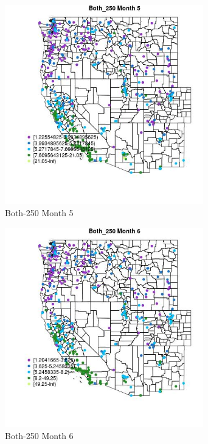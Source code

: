 \begin{figure} 
\centering  
\includegraphics[width=0.77\textwidth]{Code_Outputs/ML_input_report_ML_input_PM25_Step5_part_d_de_duplicated_aves_ML_input_MapObsMo5Both_250.jpg} 
\caption{\label{fig:ML_input_report_ML_input_PM25_Step5_part_d_de_duplicated_aves_ML_inputMapObsMo5Both_250}Both-250 Month 5} 
\end{figure} 
 

\begin{figure} 
\centering  
\includegraphics[width=0.77\textwidth]{Code_Outputs/ML_input_report_ML_input_PM25_Step5_part_d_de_duplicated_aves_ML_input_MapObsMo6Both_250.jpg} 
\caption{\label{fig:ML_input_report_ML_input_PM25_Step5_part_d_de_duplicated_aves_ML_inputMapObsMo6Both_250}Both-250 Month 6} 
\end{figure} 
 

